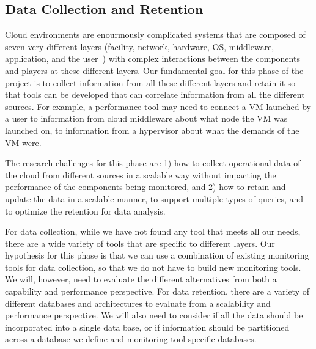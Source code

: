 \subsection{Data Collection and Retention}

Cloud environments are enourmously complicated systems that are composed of seven very different layers (facility, network, hardware, OS, middleware, application, and the user~\cite{spring2011monitoring}) with complex interactions between the components and players at these different layers.  Our fundamental goal for this phase of the project is to collect information from all these different layers and retain it so that tools can be developed that can correlate information from all the different sources.  For example, a performance tool may need to connect a VM launched by a user to information from cloud middleware about what node the VM was launched on, to information from a hypervisor about what the demands of the VM were. 


The research challenges for this phase are 1) how to collect operational data of the cloud from different sources in a scalable way without impacting the performance of the components being monitored, and 2)  how to retain and update the data in a scalable manner, to support multiple types of queries, and to optimize the retention for data analysis.

For data collection, while we have not found any tool that meets all our needs, there are a wide variety of tools that are specific to different layers.  Our hypothesis for this phase is that we can use a combination of existing monitoring tools for data collection, so that we do not have to build new monitoring tools.  We will, however, need to evaluate the different alternatives from both a capability and performance perspective.  
For data retention, there are a variety of different databases and architectures to evaluate from a scalability and performance perspective.  We will also need to consider if all the data should be incorporated into a single data base, or if information should be partitioned across a database we define and monitoring tool specific databases. 

